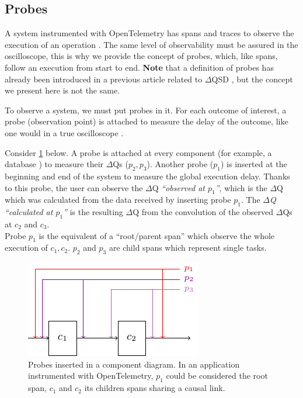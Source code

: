 \subsection{Probes}

A system instrumented with OpenTelemetry has spans and traces to observe the execution of an operation \cite{otel-t}. The same level of observability must be assured in the oscilloscope, this is why we provide the concept of probes, which, like spans, follow an execution from start to end. \textbf{Note} that a definition of probes has already been introduced in a previous article related to $\Delta$QSD \cite{dq-br}, but the concept we present here is not the same.

To observe a system, we must put probes in it. For each outcome of interest, a probe (observation point) is attached to measure the delay of the outcome, like one would in a true oscilloscope \cite{post}.

Consider \cref{fig:probes} below. A probe is attached at every component (for example, a database \cite{dq-tut}) to measure their $\Delta$Qs ($p_2, p_3$). Another probe ($p_1$) is inserted at the beginning and end of the system to measure the global execution delay. Thanks to this probe, the user can observe the $\Delta$Q \textit{``observed at $p_1$''}, which is the $\Delta$Q which was calculated from the data received by inserting probe $p_1$. The \textit{$\Delta$Q ``calculated at $p_1$''} is the resulting $\Delta$Q from the convolution of the observed $\Delta$Qs at $c_2$ and $c_3$. \\
Probe $p_1$ is the equivalent of a ``root/parent span'' which observe the whole execution of $c_1, c_2$. $p_2$ and $p_3$ are child spans which represent single tasks.

    \begin{figure}[H]
        \begin{center}
            \includegraphics[scale=1.8]{tikz/probes.pdf}
        \end{center}
        \caption{Probes inserted in a component diagram. In an application instrumented with OpenTelemetry, $p_1$ could be considered the root span, $c_1$ and $c_2$ its children spans sharing a causal link.}
        \label{fig:probes}
    \end{figure}



